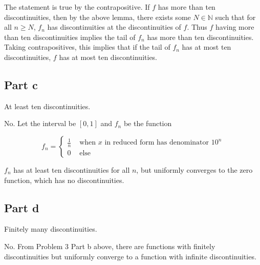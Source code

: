 \documentclass{article}
\newcommand{\N}{\mathbb{N}}
\begin{document}
The statement is true by the contrapositive. If $f$ has more than ten discontinuities, then by the above lemma, there exists some $N \in \N$ such that for all $n \geq N$, $f_n$ has discontinuities at the discontinuities of $f$. Thus $f$ having more than ten discontinuities implies the tail of $f_n$ has more than ten discontinuities. Taking contrapositives, this implies that if the tail of $f_n$ has at most ten discontinuities, $f$ has at most ten discontinuities.

\subsection*{Part c}

At least ten discontinuities.

No. Let the interval be $[0, 1]$ and $f_n$ be the function

\[
f_n = 
\begin{cases}
\frac{1}{n} & \text{ when } x \text{ in reduced form has denominator } 10^n \\
0 & \text{ else}
\end{cases}
\]

$f_n$ has at least ten discontinuities for all $n$, but uniformly converges to the zero function, which has no discontinuities.

\subsection*{Part d}

Finitely many discontinuities.

No. From Problem 3 Part b above, there are functions with finitely discontinuities but uniformly converge to a function with infinite discontinuities.
\end{document}
